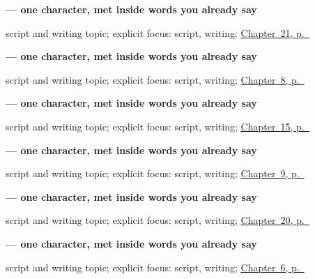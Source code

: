 \noindent\begin{minipage}[t]{\linewidth}
\raggedright
\textbf{ — one character, met inside words you already say}\par
\footnotesize script and writing topic; explicit focus: script, writing; \hyperref[ch:te-dog-and-cat]{Chapter~21, p.~\pageref*{ch:te-dog-and-cat}}
\end{minipage}\par\smallskip

\noindent\begin{minipage}[t]{\linewidth}
\raggedright
\textbf{ — one character, met inside words you already say}\par
\footnotesize script and writing topic; explicit focus: script, writing; \hyperref[ch:te-please]{Chapter~8, p.~\pageref*{ch:te-please}}
\end{minipage}\par\smallskip

\noindent\begin{minipage}[t]{\linewidth}
\raggedright
\textbf{ — one character, met inside words you already say}\par
\footnotesize script and writing topic; explicit focus: script, writing; \hyperref[ch:te-water-and-rice]{Chapter~15, p.~\pageref*{ch:te-water-and-rice}}
\end{minipage}\par\smallskip

\noindent\begin{minipage}[t]{\linewidth}
\raggedright
\textbf{ — one character, met inside words you already say}\par
\footnotesize script and writing topic; explicit focus: script, writing; \hyperref[ch:te-sorry]{Chapter~9, p.~\pageref*{ch:te-sorry}}
\end{minipage}\par\smallskip

\noindent\begin{minipage}[t]{\linewidth}
\raggedright
\textbf{ — one character, met inside words you already say}\par
\footnotesize script and writing topic; explicit focus: script, writing; \hyperref[ch:te-numbers-and-weather]{Chapter~20, p.~\pageref*{ch:te-numbers-and-weather}}
\end{minipage}\par\smallskip

\noindent\begin{minipage}[t]{\linewidth}
\raggedright
\textbf{ — one character, met inside words you already say}\par
\footnotesize script and writing topic; explicit focus: script, writing; \hyperref[ch:te-dative-case]{Chapter~6, p.~\pageref*{ch:te-dative-case}}
\end{minipage}\par\smallskip

